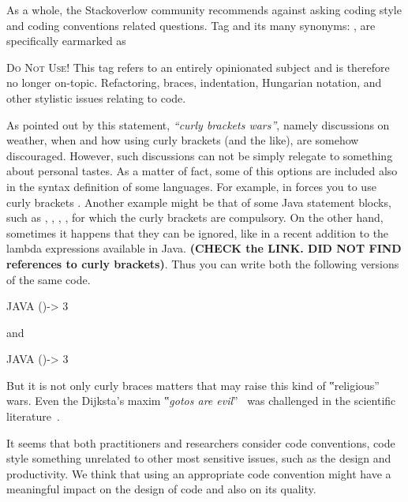 As a whole, the Stackoverlow community
recommends against asking coding style and coding conventions related questions.
Tag  and its many synonyms: ,
 are specifically
earmarked as

\begin{tcolorbox}[colback=green!5!white,colframe=blue!25!white,notitle]
    \textsc{Do Not Use!} 
This tag refers to an entirely opinionated subject and is therefore
no longer on-topic. Refactoring, braces, indentation, Hungarian notation, and
other stylistic issues relating to code.
\end{tcolorbox}

As pointed out by this statement, \emph{``curly brackets wars''}, namely discussions 
on weather, when and how using curly brackets (and the like), are somehow discouraged. 
However, such discussions can not be simply relegate to something about personal 
tastes. 
As a matter of fact, some of this options are included also in the syntax definition of some languages. 
For example, in \Go forces you to use curly brackets .
Another example might be that of some Java statement blocks, such as , , ,
, for which the curly brackets are compulsory.
On the other hand, sometimes it happens that they can be ignored, like in a recent addition to 
the lambda expressions 
available in Java.
\textbf{(CHECK the LINK. DID NOT FIND references to curly brackets)}.
Thus you can write both the following versions of the same code.
\begin{code}{JAVA}
()-> 3
\end{code}
and
\begin{code}{JAVA}
()-> {3}
\end{code}
% 

But it is not only curly braces matters that may raise
this kind of ‟religious” wars. Even the Dijksta's maxim ‟\emph{gotos
are evil}”~\cite{Dijkstra:1968} was challenged in the scientific
literature~\cite{Knuth:1974,Ramshaw:1988,Bochmann:1973,Sennesh:Gil:2016,Zoethout:1979,Wulf:1979,Clark:1984}.

It seems that both practitioners and researchers consider code conventions, code style
something unrelated to other most sensitive issues, such as the design and productivity.
We think that using an appropriate code convention might have a meaningful impact on the
design of code and also on its quality.

